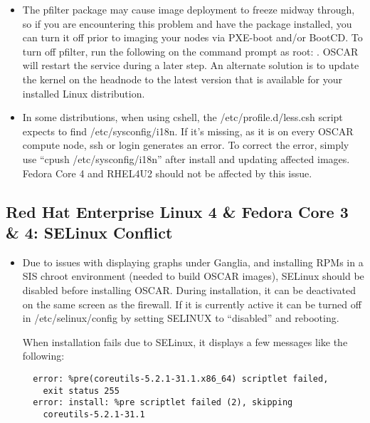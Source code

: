 \begin{itemize}
\item The pfilter package may cause image deployment to freeze midway through,
  so if you are encountering this problem and have the package installed, you
  can turn it off prior to imaging your nodes via PXE-boot and/or BootCD.
  To turn off pfilter, run the following on the command prompt as root:
  .  OSCAR will restart the service during
  a later step.  An alternate solution is to update the kernel on the headnode
  to the latest version that is available for your installed Linux distribution.

\item In some distributions, when using cshell, the 
  /etc/profile.d/less.csh script expects to find /etc/sysconfig/i18n. If 
  it's missing, as it is on every OSCAR compute node, ssh or login
  generates an error.  To correct the error, simply use 
  ``cpush /etc/sysconfig/i18n'' after install and updating affected images.
  Fedora Core 4 and RHEL4U2 should not be affected by this issue.

\end{itemize}


\subsection{Red Hat Enterprise Linux 4 \& Fedora Core 3 \& 4: SELinux Conflict }
\label{subsec:SELinuxnotes}

\begin{itemize}

\item Due to issues with displaying graphs under Ganglia, and installing
  RPMs in a SIS chroot environment (needed to build OSCAR images), SELinux 
  should be disabled before installing OSCAR.  During installation, it can be
  deactivated on the same screen as the firewall.  If it is currently
  active it can be turned off in /etc/selinux/config by setting SELINUX 
  to ``disabled'' and rebooting.

  When installation fails due to SELinux, it displays a few messages like the following:
  \begin{verbatim}
  error: %pre(coreutils-5.2.1-31.1.x86_64) scriptlet failed, 
    exit status 255
  error: install: %pre scriptlet failed (2), skipping 
    coreutils-5.2.1-31.1
  \end{verbatim}
\end{itemize}

